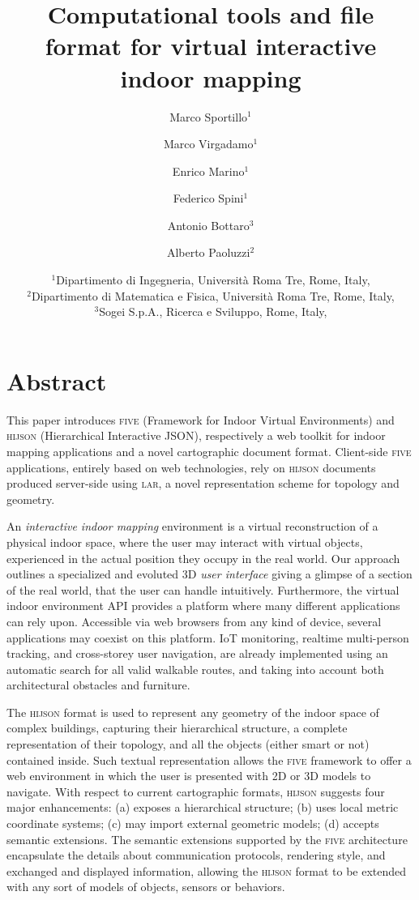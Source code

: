 \documentclass[11pt,oneside,A4]{amsart}   	%
\title{Computational tools and file format for virtual interactive indoor mapping}
\author{Marco Sportillo$^1$ \and Marco Virgadamo$^1$ \and Enrico Marino$^1$ \and Federico Spini$^1$ \and Antonio Bottaro$^3$ \and Alberto Paoluzzi$^2$}
\date{
$^1$Dipartimento di Ingegneria, Universit\`a Roma Tre, Rome, Italy,  \\
$^2$Dipartimento di Matematica e Fisica, Universit\`a Roma Tre, Rome, Italy,  \\
$^3$Sogei S.p.A., Ricerca e Sviluppo, Rome, Italy, 
}							%
\begin{document}
\maketitle

\section*{Abstract}

This paper introduces \textsc{\large five} (Framework for Indoor Virtual Environments) and \textsc{\large hijson} (Hierarchical Interactive JSON), respectively a web toolkit for indoor mapping applications and a novel cartographic document format. Client-side \textsc{\large five} applications, entirely based on web technologies, rely on \textsc{\large hijson} documents produced server-side using \textsc{\large lar}, a novel representation scheme for topology and geometry.

An \emph{interactive indoor mapping} environment is a virtual reconstruction of a physical indoor space, where the user may interact with virtual objects, experienced in the actual position they occupy in the real world. Our approach outlines a specialized and evoluted  3D \emph{user interface} giving a glimpse of a section of the real world, that the user can handle intuitively.  Furthermore, the virtual indoor environment API provides a platform where many different applications can rely upon. Accessible via web browsers from any kind of device, several applications may coexist on this platform. IoT monitoring, realtime multi-person tracking, and  cross-storey user navigation, are already implemented using an automatic search for all valid walkable routes, and taking into account both architectural obstacles and furniture.

The \textsc{\large hijson} format is used to represent any geometry of the indoor space of complex buildings, capturing their hierarchical structure, a complete representation of their topology, and all the objects (either smart or not) contained inside. Such textual representation allows the \textsc{\large five} framework to offer a web environment in which the user is presented with 2D or 3D models to navigate. With respect to current cartographic formats, \textsc{\large hijson} suggests four major enhancements: (a) exposes a hierarchical structure; (b) uses local metric coordinate systems; (c) may import external geometric models; (d) accepts semantic extensions.
The semantic extensions supported by the \textsc{\large five} architecture encapsulate the details about communication protocols, rendering style, and exchanged and displayed information, allowing the \textsc{\large hijson} format to be extended with any sort of models of objects, sensors or behaviors.
\end{document}
